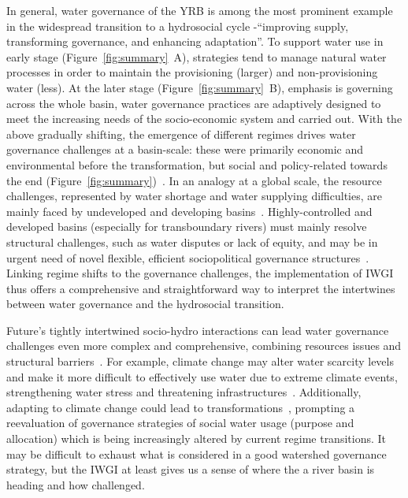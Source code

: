 In general, water governance of the YRB is among the most prominent example in the widespread transition to a hydrosocial cycle -``improving supply, transforming governance, and enhancing adaptation''.
To support water use in early stage (Figure~\ref{fig:summary}~A), strategies tend to manage natural water processes in order to maintain the provisioning (larger) and non-provisioning water (less).
At the later stage (Figure~\ref{fig:summary}~B), emphasis is governing across the whole basin, water governance practices are adaptively designed to meet the increasing needs of the socio-economic system and carried out.
With the above gradually shifting, the emergence of different regimes drives water governance challenges at a basin-scale: these were primarily economic and environmental before the transformation, but social and policy-related towards the end (Figure~\ref{fig:summary})~\cite{singh2019,porcher2019}.
In an analogy at a global scale, the resource challenges, represented by water shortage and water supplying difficulties, are mainly faced by undeveloped and developing basins~\cite{allan2019,speed2013,liu2012}.
Highly-controlled and developed basins (especially for transboundary rivers) must mainly resolve structural challenges, such as water disputes or lack of equity, and may be in urgent need of novel flexible, efficient sociopolitical governance structures~\cite{unep-dhi2016,mirumachi2015}.
Linking regime shifts to the governance challenges, the implementation of IWGI thus offers a comprehensive and straightforward way to interpret the intertwines between water governance and the hydrosocial transition.

Future's tightly intertwined socio-hydro interactions can lead water governance challenges even more complex and comprehensive, combining resources issues and structural barriers~\cite{huggins2022a}.
For example, climate change may alter water scarcity levels and make it more difficult to effectively use water due to extreme climate events, strengthening water stress and threatening infrastructures~\cite{liu2017, dibaldassarre2019}.
Additionally, adapting to climate change could lead to transformations~\cite{sachs2019,barnes2020}, prompting a reevaluation of governance strategies of social water usage (purpose and allocation) which is being increasingly altered by current regime transitions.
It may be difficult to exhaust what is considered in a good watershed governance strategy, but the IWGI at least gives us a sense of where the a river basin is heading and how challenged.

